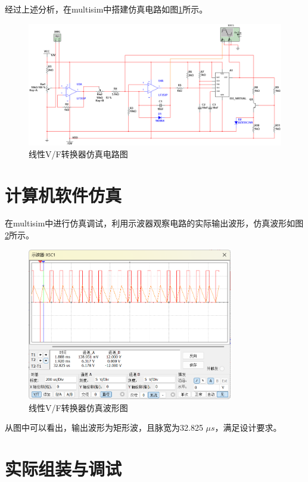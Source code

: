 \documentclass[12pt]{article}
\begin{document}
经过上述分析，在multisim中搭建仿真电路如图\ref{fig:Circuitdiagram}所示。
\begin{figure}[htbp]
    \centering
    \includegraphics[width=1\textwidth]{fig/Circuit_diagram.jpg}
    \caption{线性V/F转换器仿真电路图}
    \label{fig:Circuitdiagram}
\end{figure}

\section{计算机软件仿真}

在multisim中进行仿真调试，利用示波器观察电路的实际输出波形，仿真波形如图\ref{fig:Simulated_waveform}所示。

\begin{figure}[htbp]
    \centering
    \includegraphics[width=0.8\textwidth]{fig/Simulated_waveform.jpg}
    \caption{线性V/F转换器仿真波形图}
    \label{fig:Simulated_waveform}
\end{figure}

从图中可以看出，输出波形为矩形波，且脉宽为32.825 $\mu s$，满足设计要求。

\section{实际组装与调试}
\end{document}
